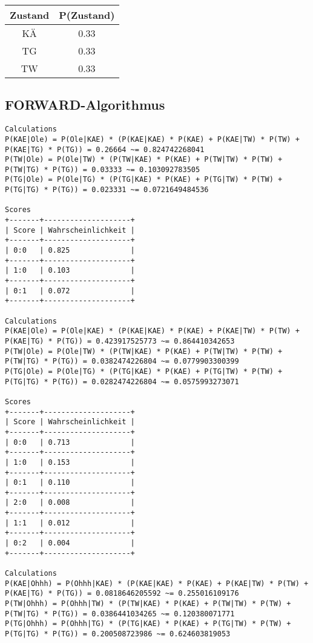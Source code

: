 \documentclass[a4paper]{article}
\begin{document}
\begin{tabular}{|c|c|}
\hline
Zustand & P(Zustand) \\\hline
KÄ & 0.33 \\
TG & 0.33 \\
TW & 0.33 \\\hline
\end{tabular}

\subsection{FORWARD-Algorithmus}
\begin{lstlisting}
Calculations
P(KAE|Ole) = P(Ole|KAE) * (P(KAE|KAE) * P(KAE) + P(KAE|TW) * P(TW) + P(KAE|TG) * P(TG)) = 0.26664 ~= 0.824742268041
P(TW|Ole) = P(Ole|TW) * (P(TW|KAE) * P(KAE) + P(TW|TW) * P(TW) + P(TW|TG) * P(TG)) = 0.03333 ~= 0.103092783505
P(TG|Ole) = P(Ole|TG) * (P(TG|KAE) * P(KAE) + P(TG|TW) * P(TW) + P(TG|TG) * P(TG)) = 0.023331 ~= 0.0721649484536

Scores
+-------+--------------------+
| Score | Wahrscheinlichkeit |
+-------+--------------------+
| 0:0   | 0.825              |
+-------+--------------------+
| 1:0   | 0.103              |
+-------+--------------------+
| 0:1   | 0.072              |
+-------+--------------------+

Calculations
P(KAE|Ole) = P(Ole|KAE) * (P(KAE|KAE) * P(KAE) + P(KAE|TW) * P(TW) + P(KAE|TG) * P(TG)) = 0.423917525773 ~= 0.864410342653
P(TW|Ole) = P(Ole|TW) * (P(TW|KAE) * P(KAE) + P(TW|TW) * P(TW) + P(TW|TG) * P(TG)) = 0.0382474226804 ~= 0.0779903300399
P(TG|Ole) = P(Ole|TG) * (P(TG|KAE) * P(KAE) + P(TG|TW) * P(TW) + P(TG|TG) * P(TG)) = 0.0282474226804 ~= 0.0575993273071

Scores
+-------+--------------------+
| Score | Wahrscheinlichkeit |
+-------+--------------------+
| 0:0   | 0.713              |
+-------+--------------------+
| 1:0   | 0.153              |
+-------+--------------------+
| 0:1   | 0.110              |
+-------+--------------------+
| 2:0   | 0.008              |
+-------+--------------------+
| 1:1   | 0.012              |
+-------+--------------------+
| 0:2   | 0.004              |
+-------+--------------------+

Calculations
P(KAE|Ohhh) = P(Ohhh|KAE) * (P(KAE|KAE) * P(KAE) + P(KAE|TW) * P(TW) + P(KAE|TG) * P(TG)) = 0.0818646205592 ~= 0.255016109176
P(TW|Ohhh) = P(Ohhh|TW) * (P(TW|KAE) * P(KAE) + P(TW|TW) * P(TW) + P(TW|TG) * P(TG)) = 0.0386441034265 ~= 0.120380071771
P(TG|Ohhh) = P(Ohhh|TG) * (P(TG|KAE) * P(KAE) + P(TG|TW) * P(TW) + P(TG|TG) * P(TG)) = 0.200508723986 ~= 0.624603819053


\end{lstlisting}
\end{document}
